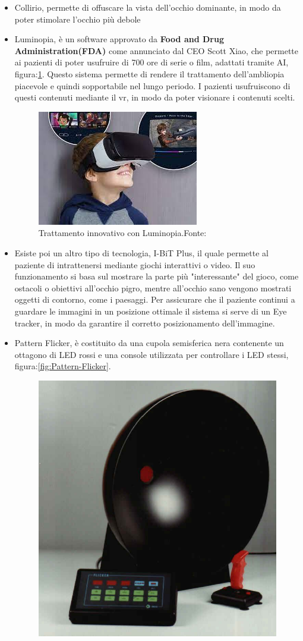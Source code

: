 \documentclass[
a4paper,
cleardoublepage=empty,
headings=twolinechapter,
numbers=autoenddot,
]{scrbook}
\begin{document}
\begin{itemize}
		\item Collirio, permette di offuscare la vista dell'occhio dominante, in modo da poter stimolare l'occhio più debole
		
		\item Luminopia, è un software approvato da \textbf{Food and Drug Administration(FDA)}\cite{Approvazione_luminopia} come annunciato dal CEO Scott Xiao, che permette ai pazienti di poter usufruire di 700 ore di serie o film, adattati tramite AI, figura:\ref{fig:luminopia}. Questo sistema permette di rendere il trattamento dell'ambliopia piacevole e quindi sopportabile nel lungo periodo.
		I pazienti usufruiscono di questi contenuti mediante il vr, in modo da poter visionare i contenuti scelti.
		\begin{figure}[H]
			\centering
			\includegraphics[width=0.6\linewidth]{image/luminopia}
			\caption{Trattamento innovativo con Luminopia.Fonte:\cite{Lumiopia_image}}
			\label{fig:luminopia}
		\end{figure}
		\item Esiste poi un altro tipo di tecnologia, I-BiT Plus\cite{I-Bit}, il quale permette al paziente di intrattenersi mediante giochi interattivi o video.
		Il suo funzionamento si basa sul mostrare la parte più "interessante" del gioco, come ostacoli o obiettivi all'occhio pigro, mentre all'occhio sano vengono mostrati oggetti di contorno, come i paesaggi.
		Per assicurare che il paziente continui a guardare le immagini in un posizione ottimale il sistema si serve di un Eye tracker, in modo da garantire il corretto posizionamento dell'immagine.
		\item Pattern Flicker\cite{Pattern-Flicker}, è costituito da una cupola semisferica nera contenente un ottagono di LED rossi e una console utilizzata per controllare i LED stessi, figura:\ref{fig:Pattern-Flicker}.
		\begin{figure}[H]
			\centering
			\includegraphics[width=0.4\linewidth]{image/Pattern_Flicker}

\end{figure}
\end{itemize}
\end{document}
